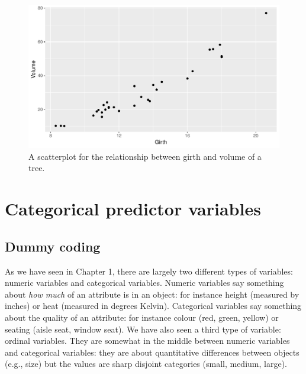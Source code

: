 \documentclass[]{report}\usepackage[]{graphicx}\usepackage[]{color}
\makeatletter
\def\maxwidth{ %
  \ifdim\Gin@nat@width>\linewidth
    \linewidth
  \else
    \Gin@nat@width
  \fi
}
\newenvironment{knitrout}{}{} %
\makeatother
\begin{document}
\begin{knitrout}
\color{fgcolor}\begin{figure}

{\centering \includegraphics[width=\maxwidth]{figure/multi_8-1} 

}

\caption[A scatterplot for the relationship between girth and volume of a tree]{A scatterplot for the relationship between girth and volume of a tree.}\label{fig:multi_8}
\end{figure}


\end{knitrout}





\chapter{Categorical predictor variables}\label{chap:categorical}



\section{Dummy coding}
As we have seen in Chapter 1, there are largely two different types of variables: numeric variables and categorical variables. Numeric variables say something about \textit{how much} of an attribute is in an object: for instance height (measured by inches) or heat (measured in degrees Kelvin). Categorical variables say something about the quality of an attribute: for instance colour (red, green, yellow) or seating (aisle seat, window seat). We have also seen a third type of variable: ordinal variables. They are somewhat in the middle between numeric variables and categorical variables: they are about quantitative differences between objects (e.g., size) but the values are sharp disjoint categories (small, medium, large).
\end{document}
